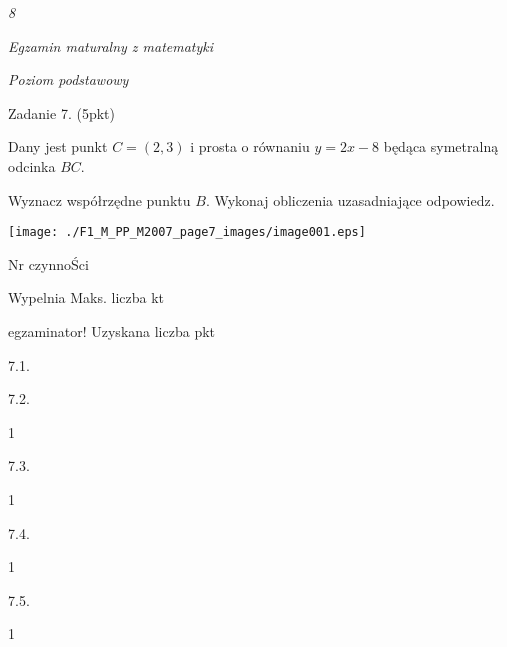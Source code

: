 \documentclass[a4paper,12pt]{article}
\begin{document}
{\it 8}

{\it Egzamin maturalny z matematyki}

{\it Poziom podstawowy}

Zadanie 7. (5pkt)

Dany jest punkt $C=(2,3)$ i prosta o równaniu $y=2x-8$ będąca symetralną odcinka $BC.$

Wyznacz współrzędne punktu $B$. Wykonaj obliczenia uzasadniające odpowiedz.
\begin{center}
\texttt{[image: ./F1\_M\_PP\_M2007\_page7\_images/image001.eps]}
\end{center}
Nr czynnoŚci

Wypelnia Maks. liczba kt

egzaminator! Uzyskana liczba pkt

7.1.

7.2.

1

7.3.

1

7.4.

1

7.5.

1
\end{document}

